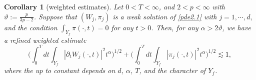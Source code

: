 \documentclass[13pt,CJK]{article}
\theoremstyle{plain}                       %
\newtheorem{corollary}[lemma]{Corollary}
\theoremstyle{remark}
\numberwithin{equation}{section}
\begin{document}
\begin{corollary}[weighted estimates]\label{lemma3.4}
Let $0<T<\infty$, and $2<p<\infty$ with $\vartheta:= \frac{p}{3p-2}$.
Suppose that $(W_j,\pi_j)$ is a weak solution of \eqref{pde2.1}
with $j=1,\cdots,d,$ and the condition $\int_{Y_f}\pi(\cdot,t)=0$ for any $t> 0$.
Then, for any $\alpha>2\vartheta$,
we have a refined weighted estimate
\begin{equation}\label{pri:3.9}
\bigg(\int_{0}^{T}dt\int_{Y_f}|\partial_t W_j(\cdot, t)|^2t^{\alpha}\bigg)^{1/2}
+ \bigg(\int_{0}^{T}dt\int_{Y_f}|\pi_j(\cdot, t)|^2t^{\alpha}\bigg)^{1/2}
\lesssim 1,
\end{equation}
where the up to constant depends on $d$, $\alpha$, $T$, and the character of
$Y_f$.
\end{corollary}
\end{document}
